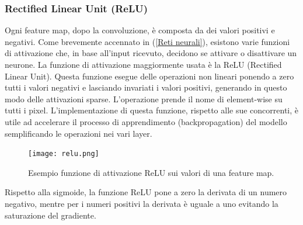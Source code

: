 \subsubsection{Rectified Linear Unit (ReLU)}
Ogni feature map, dopo la convoluzione, è composta da dei valori positivi e negativi. 
Come brevemente accennato in (\ref{Reti neurali}), esistono varie funzioni di attivazione che, in 
base all’input ricevuto, decidono se attivare o disattivare un neurone. La 
funzione di attivazione maggiormente usata è la ReLU (Rectified Linear Unit). 
Questa funzione esegue delle operazioni non lineari ponendo a zero tutti i valori 
negativi e lasciando invariati i valori positivi, generando in questo modo delle 
attivazioni sparse.  L’operazione prende il nome di element-wise su tutti i pixel. 
L’implementazione di questa funzione, rispetto alle sue concorrenti, è utile ad accelerare 
il processo di apprendimento (backpropagation) del modello semplificando 
le operazioni nei vari layer.
\begin{figure}[H]
    \centering
    \texttt{[image: relu.png]}
    \centering
    \caption{Esempio funzione di attivazione ReLU sui valori di una feature map.}
    \label{relu}
\end{figure}
Rispetto alla sigmoide, la funzione ReLU pone a zero la derivata di un numero 
negativo, mentre per i numeri positivi la derivata è uguale a uno evitando la 
saturazione del gradiente.

